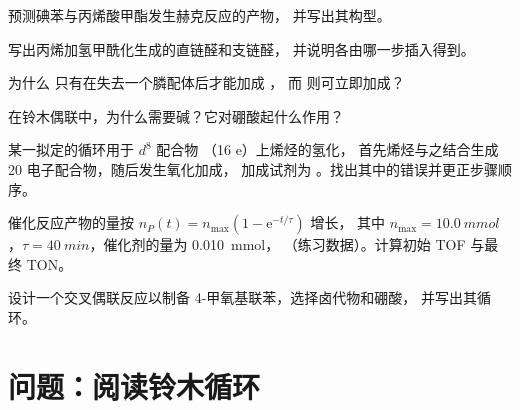\begin{exercise}[$\star\star$]\label{exo:b2:catalytic-cycles:6}
预测碘苯与丙烯酸甲酯发生赫克反应的产物，
并写出其构型。
\end{exercise}

\begin{exercise}[$\star\star$]\label{exo:b2:catalytic-cycles:7}
写出丙烯加氢甲酰化生成的直链醛和支链醛，
并说明各由哪一步插入得到。
\end{exercise}

\begin{exercise}[$\star\star$]\label{exo:b2:catalytic-cycles:8}
为什么  只有在失去一个膦配体后才能加成 ，
而  则可立即加成？
\end{exercise}

\begin{exercise}[$\star\star$]\label{exo:b2:catalytic-cycles:9}
在铃木偶联中，为什么需要碱？它对硼酸起什么作用？
\end{exercise}

\begin{exercise}[$\star\star\star$]\label{exo:b2:catalytic-cycles:10}
某一拟定的循环用于 $d^8$ 配合物 （16 e）上烯烃的氢化，
首先烯烃与之结合生成 20 电子配合物，随后发生氧化加成，
加成试剂为 。找出其中的错误并更正步骤顺序。
\end{exercise}

\begin{exercise}[$\star\star\star$]\label{exo:b2:catalytic-cycles:11}
催化反应产物的量按 $n_P(t) = n_{\max}(1 - \mathrm e^{-t/\tau})$ 增长，
其中 $n_{\max} = \qty{10.0}{mmol}$，$\tau = \qty{40}{min}$，催化剂的量为 \qty{0.010}{mmol}，
（练习数据）。计算初始 TOF 与最终 TON。
\end{exercise}

\begin{exercise}[$\star\star\star$]\label{exo:b2:catalytic-cycles:12}
设计一个交叉偶联反应以制备 4-甲氧基联苯，选择卤代物和硼酸，
并写出其循环。
\end{exercise}

\section{问题：阅读铃木循环}


